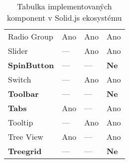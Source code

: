 \begin{table}[ht]
\begin{tabularx}{\textwidth}{Y Y Y Y}
        Radio Group           & Ano                   & Ano                & Ano                               \\
        Slider                & ---                   & Ano                & Ano                               \\
        \textbf{SpinButton}   & ---                   & ---                & \textbf{Ne}                       \\
        Switch                & ---                   & Ano                & Ano                               \\
        \textbf{Toolbar}      & ---                   & ---                & \textbf{Ne}                       \\
        \textbf{Tabs}         & Ano                   & ---                & Ano                               \\
        Tooltip               & ---                   & Ano                & Ano                               \\
        Tree View             & Ano                   & ---                & Ano                               \\
        \textbf{Treegrid}     & ---                   & ---                & \textbf{Ne}                       \\
    \end{tabularx}
    \caption{Tabulka implementovaných komponent v Solid.js ekosystému}
    \label{tab:implemented-components}
\end{table}
